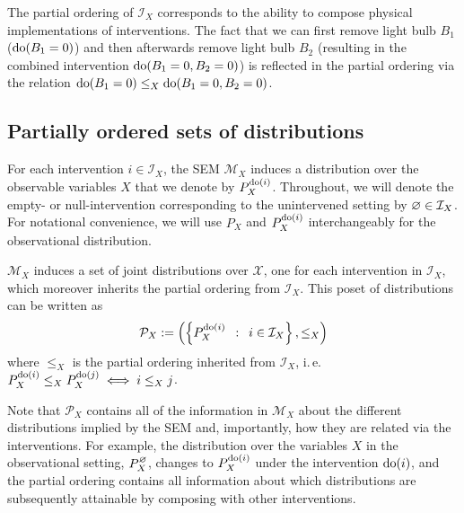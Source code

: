 The partial ordering of $\mathcal{I}_X$ corresponds to the ability to compose physical implementations of interventions. The fact that we can first remove light bulb $B_1$ (${\operatorname{do}(B_1=0)}$) and then afterwards remove light bulb $B_2$ (resulting in the combined intervention ${\operatorname{do}(B_1=0, B_2=0)}$)  is reflected in the partial ordering via the relation ${\operatorname{do}(B_1=0) \leq_X \operatorname{do}(B_1=0,B_2=0)}$.

\subsection{Partially ordered sets of distributions}

For each intervention $i \in \mathcal{I}_X$, the SEM $\mathcal{M}_X$ induces a distribution over the observable variables $X$ that we denote by $P_X^{\operatorname{do}(i)}$.
Throughout, we will denote the empty- or null-intervention corresponding to the unintervened setting by $\varnothing\in \mathcal{I}_X$.
For notational convenience, we will use $P_X$ and $P_X^{\operatorname{do}(i)}$ interchangeably for the observational distribution.

$\mathcal{M}_X$ induces a set of joint distributions over $\mathcal{X}$, one for each intervention in $\mathcal{I}_X$, which moreover inherits the partial ordering from $\mathcal{I}_X$. 
This poset of distributions can be written as
\[\mathcal{P}_X := \left( \left\{ P_X^{\operatorname{do}(i)} \enspace : \enspace i \in \mathcal{I}_X \right\}, \leq_X \right) \]
where $\leq_X$ is the partial ordering inherited from $\mathcal{I}_X$, i.\,e.\ ${P_X^{\operatorname{do}(i)} \leq_X P_X^{\operatorname{do}(j)} \iff i \leq_X j}$.%

Note that $\mathcal{P}_X$ contains all of the information in $\mathcal{M}_X$ about the different distributions implied by the SEM and, importantly, how they are related via the interventions.
For example, the distribution over the variables $X$ in the observational setting, $P_X^\varnothing$, changes to $P_X^{\operatorname{do}(i)}$ under the intervention ${\operatorname{do}(i)}$, and the partial ordering contains all information about which distributions are subsequently attainable by composing with other interventions.


